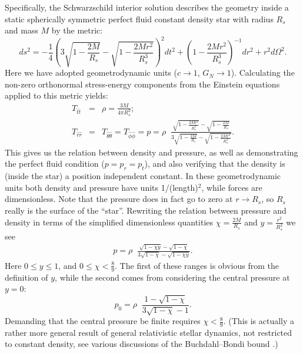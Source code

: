 \documentclass[12pt]{article}
\begin{document}
\clearpage
Specifically, the Schwarzschild interior solution describes the geometry inside a static spherically symmetric perfect fluid constant density star with radius $R_s$ and mass $M$ by the metric:
%
\begin{equation}
\label{Eq:IntSchwarzschild}
ds^2 = -\frac{1}{4}\left(3\sqrt{1- \frac{2 M}{ R_s}} - \sqrt{1 - \frac{2 M r^2}{ R_s^3}}\right)^2 dt^2 
+ \left(1 - \frac{2 M r^2}{ R_s^3}\right)^{-1} dr^2 + r^2d\Omega^2.
\end{equation}
%
Here we have adopted geometrodynamic units ($c\to1$, $G_N\to1$).  Calculating the non-zero orthonormal stress-energy components from the Einstein equations applied to this metric yields: 
%
\begin{eqnarray}
    T_{\hat{t}\hat{t}} &=& \rho =  \frac{3M}{4\pi R_s^3};\\
    T_{\hat{r}\hat{r}} &=& T_{\hat{\theta}\hat{\theta}} =   T_{\hat{\phi}\hat{\phi}}
    = p =    
    \rho \;\; \frac{\sqrt{1-\frac{2 M r^2}{ R_s^3}}-\sqrt{1-\frac{2 M}{ R_s}}}
    {3\sqrt{1-\frac{2 M}{ R_s}}-\sqrt{1-\frac{2 M r^2}{ R_s^3}}}.
 \end{eqnarray}
%
This gives us the relation between density and pressure, as well as demonstrating the perfect fluid condition ($p = p_r = p_t$), and also verifying that the density is (inside the star) a position independent constant. 
In these geometrodynamic units both density and pressure have units 1/(length)$^2$, while forces are dimensionless.
Note that the pressure does in fact go to zero at $r\to R_s$, so $R_s$ really is the surface of the ``star''. 
Rewriting the relation between pressure and density in terms of the simplified dimensionless quantities $\chi = \frac{2 M}{ R_s}$ and $y = \frac{r^2}{R_s^2}$ we see
%
\begin{eqnarray}
    \label{eq:InteriorPressure}
    p =  \rho \;\;\frac{\sqrt{1-\chi y}-\sqrt{1-\chi}}{3\sqrt{1-\chi}-\sqrt{1-\chi y}}.
\end{eqnarray}
%
Here $0 \leq y \leq 1$, and $0\leq \chi <\frac{8}{9}$. The first of these ranges is obvious from the definition of $y$, while the second comes from considering the central pressure at $y=0$:
\begin{equation}
p_0 = \rho \;\;\frac{1-\sqrt{1-\chi}}{3\sqrt{1-\chi}-1}.
\end{equation}
Demanding that the central pressure be finite requires $\chi <\frac{8}{9}$. 
(This is actually a rather more general result of general relativistic stellar dynamics, not restricted to constant density, see various discussions of the Buchdahl--Bondi bound \cite{Buchdahl-bound,Bondi-bound}.)
\end{document}
